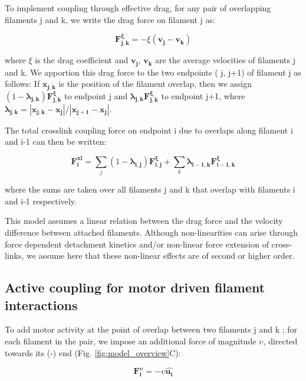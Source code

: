 To implement coupling through effective drag, for any pair of overlapping filaments j and k, we write the drag force on filament j as:

\begin{equation}
\label{eqn:drag force}
\mathbf{F^{\xi}_{j,k}} = -\xi  (\mathbf{v_{j}}-\mathbf{v_{k}}) 
\end{equation}

where $\xi$ is the drag coefficient and $\mathbf{v_{j}}$, $\mathbf{v_{k}}$ are the average velocities of filaments j and k. We apportion this drag force to the two endpoints ( j, j+1) of filament j as follows: If $\mathbf{x_{j,k}}$ is the position of the filament overlap, then we assign $(1 - \mathbf{\lambda_{j,k}}) \mathbf{F^{\xi}_{j,k}}$ to endpoint j and $\mathbf{\lambda_{j,k}} \mathbf{F^{\xi}_{j,k}}$ to endpoint j+1, where $\mathbf{\lambda_{j,k}} = |\mathbf{x_{j,k}}-\mathbf{x_j}|/|\mathbf{x_{j+1}}-\mathbf{x_j}|$.

The total crosslink coupling force on endpoint i due to overlaps along filament i and i-1 can then be written:

\begin{equation}
\label{eqn: total drag couple}
\mathbf{F^{xl}_{i}} = \sum_j (1 - \mathbf{\lambda_{i,j}}) \mathbf{F^{\xi}_{i,j}} + \sum_k \mathbf{\lambda_{i-1,k}} \mathbf{F^{\xi}_{i-1,k}}
\end{equation}

where the sums are taken over all filaments j and k that overlap with filaments i and i-1 respectively.  

This model assumes a linear relation between the drag force and the velocity difference between attached filaments.   Although non-linearities can arise through force dependent detachment kinetics and/or non-linear force extension of cross-links, we assume here that these non-linear effects are of second or higher order. 

\subsection{Active coupling for motor driven filament interactions}

To add motor activity at the point of overlap between two filaments j and k ; for each filament in the pair, we impose an additional force of magnitude $\upsilon$, directed towards its (-) end (Fig. \ref{fig:model_overview}C):

\begin{equation}
\label{eqn:directedmotorforce}
\mathbf{F^{\upsilon}_{i}}=-\upsilon \mathbf{\hat{u_i}}
\end{equation}

